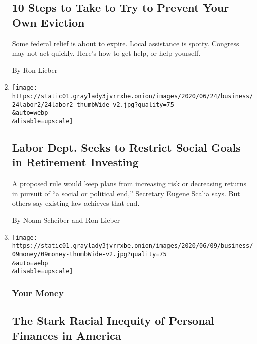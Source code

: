 \begin{enumerate}
  \hypertarget{10-steps-to-take-to-try-to-prevent-your-own-eviction}{%
  \subsection{10 Steps to Take to Try to Prevent Your Own
  Eviction}\label{10-steps-to-take-to-try-to-prevent-your-own-eviction}}

  Some federal relief is about to expire. Local assistance is spotty.
  Congress may not act quickly. Here's how to get help, or help
  yourself.

  By Ron Lieber
\item
  \href{/2020/06/24/business/labor-retirement-investing.html}{}

  \texttt{[image: https://static01.graylady3jvrrxbe.onion/images/2020/06/24/business/24labor2/24labor2-thumbWide-v2.jpg?quality=75\\\&auto=webp\\\&disable=upscale]}

  \hypertarget{labor-dept-seeks-to-restrict-social-goals-in-retirement-investing}{%
  \subsection{Labor Dept. Seeks to Restrict Social Goals in Retirement
  Investing}\label{labor-dept-seeks-to-restrict-social-goals-in-retirement-investing}}

  A proposed rule would keep plans from increasing risk or decreasing
  returns in pursuit of ``a social or political end,'' Secretary Eugene
  Scalia says. But others say existing law achieves that end.

  By Noam Scheiber and Ron Lieber
\item
  \href{/2020/06/09/your-money/race-income-equality.html}{}

  \texttt{[image: https://static01.graylady3jvrrxbe.onion/images/2020/06/09/business/09money/09money-thumbWide-v2.jpg?quality=75\\\&auto=webp\\\&disable=upscale]}

  \hypertarget{your-money-2}{%
  \subsubsection{Your Money}\label{your-money-2}}

  \hypertarget{the-stark-racial-inequity-of-personal-finances-in-america}{%
  \subsection{The Stark Racial Inequity of Personal Finances in
  America}\label{the-stark-racial-inequity-of-personal-finances-in-america}}


\end{enumerate}
